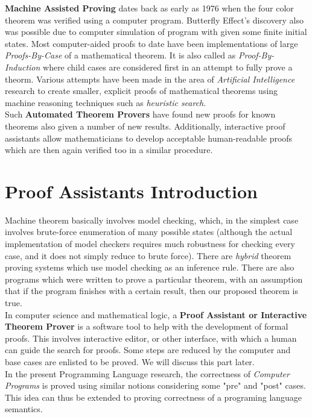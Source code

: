 \hfill \break \textbf{Machine Assisted Proving} dates back as early as 1976 when the four color theorem was verified using a computer program. Butterfly Effect's discovery also was possible due to computer simulation of program with given some finite initial states. Most computer-aided proofs to date have been implementations of large \textit{Proofs-By-Case} of a mathematical theorem. It is also called as \textit{Proof-By-Induction}  where child cases are considered first in an attempt to fully prove a theorm. Various attempts have been made in the area of \textit{Artificial Intelligence} research to create smaller, explicit proofs of mathematical theorems using machine reasoning techniques such as \textit{heuristic search}.\\

Such \textbf{Automated Theorem Provers} have found new proofs for known theorems also given a number of new results. Additionally, interactive proof assistants allow mathematicians to develop acceptable human-readable proofs which are then again verified too in a similar procedure.   

\section{Proof Assistants Introduction}

Machine theorem basically involves model checking, which, in the simplest case involves brute-force enumeration of many possible states (although the actual implementation of model checkers requires much robustness for checking every case, and it does not simply reduce to brute force). There are \textit{hybrid} theorem  proving systems which use model checking as an inference rule. There are also programs which were written to prove a particular theorem, with an assumption that if the program finishes with a certain result, then our proposed theorem is true.\\

In computer science and mathematical logic, a \textbf{Proof Assistant or Interactive Theorem Prover} is a software tool to help with the development of formal proofs. This involves interactive editor, or other interface, with which a human can guide the search for proofs. Some steps are reduced by the computer and base cases are enlisted to be proved. We will discuss this part later. \\

\hfill \break In the present Programming Language research, the correctness of \textit{Computer Programs} is proved using similar notions considering some "pre" and "post" cases. This idea can thus be extended to proving correctness of a programing language semantics. \\

